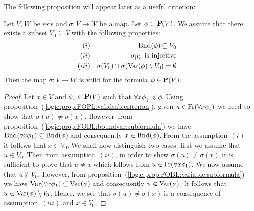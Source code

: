 The following proposition will appear later as a useful criterion:
\begin{prop}\label{logic:prop:FOPL:validsub:minimalextension}
Let $V$, $W$ be sets and $\sigma:V\to W$ be a map. Let $\phi\in\mbox{${\bf P}(V)$}$.
We assume that there exists a subset $V_{0}\subseteq V$ with the
following properties:
    \begin{eqnarray*}
    (i)&&\mbox{\rm Bnd}(\phi)\subseteq V_{0}\\
    (ii)&&\mbox{$\sigma_{|V_{0}}$ is injective}\\
    (iii)&&\sigma(V_{0})\cap\sigma(\mbox{\rm Var}(\phi)\setminus
    V_{0})=\emptyset
    \end{eqnarray*}
Then the map $\sigma:V\to W$ is valid for the formula $\phi\in\mbox{${\bf P}(V)$}$.
\end{prop}
\begin{proof}
Let $x\in V$ and $\phi_{1}\in\mbox{${\bf P}(V)$}$ such that $\forall
x\phi_{1}\preceq\phi$. Using
proposition~(\ref{logic:prop:FOPL:validsub:criterion}), given
$u\in\mbox{\rm Fr}(\forall x\phi_{1})$ we need to show that
$\sigma(u)\neq\sigma(x)$. However, from
proposition~(\ref{logic:prop:FOBL:boundvar:subformula}) we have
$\mbox{\rm Bnd}(\forall x\phi_{1})\subseteq\mbox{\rm Bnd}(\phi)$ and consequently
$x\in\mbox{\rm Bnd}(\phi)$. From the assumption~$(i)$ it follows that $x\in
V_{0}$. We shall now distinguish two cases: first we assume that
$u\in V_{0}$. Then from assumption~$(ii)$, in order to show
$\sigma(u)\neq\sigma(x)$ it is sufficient to prove that $u\neq x$
which follows from $u\in\mbox{\rm Fr}(\forall x\phi_{1})$. We now assume
that $u\not\in V_{0}$. However, from
proposition~(\ref{logic:prop:FOBL:variable:subformula}) we have
$\mbox{\rm Var}(\forall x\phi_{1})\subseteq\mbox{\rm Var}(\phi)$ and consequently
$u\in\mbox{\rm Var}(\phi)$. It follows that $u\in\mbox{\rm Var}(\phi)\setminus V_{0}$.
Hence, we see that $\sigma(u)\neq\sigma(x)$ is a consequence of
assumption~$(iii)$ and $x\in V_{0}$.
\end{proof}

